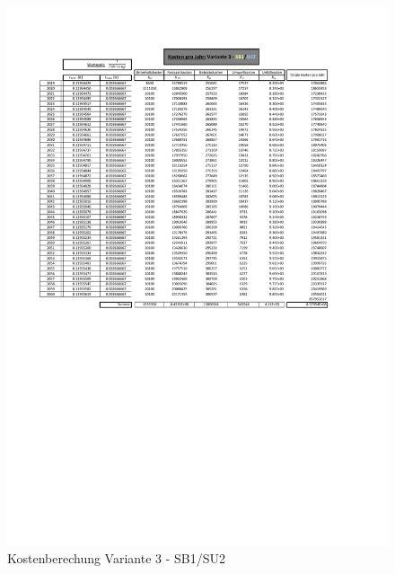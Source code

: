 \begin{figure}[h!]
	\centering
	\includegraphics[width=\textwidth]{figures/Anhang/f-00-A-V3-B1-U2}
	\caption{Kostenberechung Variante 3 - SB1/SU2}
\end{figure}

